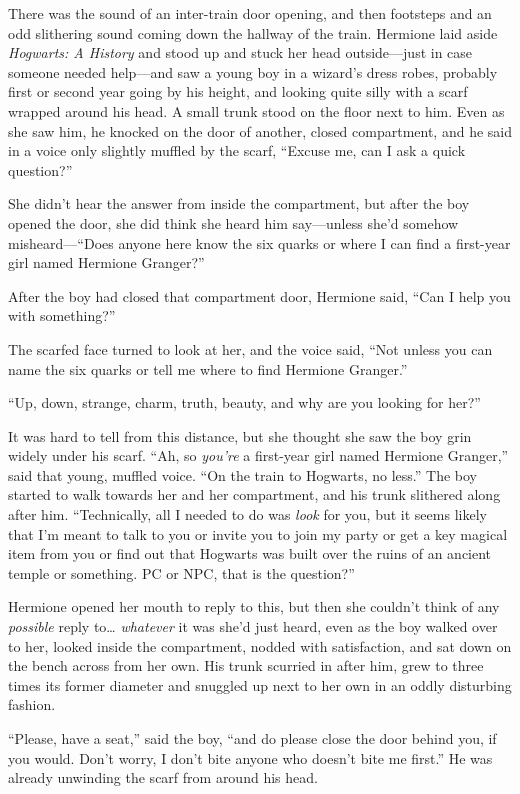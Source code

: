 There was the sound of an inter-train door opening, and then footsteps
and an odd slithering sound coming down the hallway of the train.
Hermione laid aside \emph{Hogwarts: A History} and stood up and stuck
her head outside---just in case someone needed help---and saw a young
boy in a wizard's dress robes, probably first or second year going by
his height, and looking quite silly with a scarf wrapped around his
head. A small trunk stood on the floor next to him. Even as she saw him,
he knocked on the door of another, closed compartment, and he said in a
voice only slightly muffled by the scarf, ``Excuse me, can I ask a quick
question?''

She didn't hear the answer from inside the compartment, but after the
boy opened the door, she did think she heard him say---unless she'd
somehow misheard---``Does anyone here know the six quarks or where I can
find a first-year girl named Hermione Granger?''

After the boy had closed that compartment door, Hermione said, ``Can I
help you with something?''

The scarfed face turned to look at her, and the voice said, ``Not unless
you can name the six quarks or tell me where to find Hermione Granger.''

``Up, down, strange, charm, truth, beauty, and why are you looking for
her?''

It was hard to tell from this distance, but she thought she saw the boy
grin widely under his scarf. ``Ah, so \emph{you're} a first-year girl
named Hermione Granger,'' said that young, muffled voice. ``On the train
to Hogwarts, no less.'' The boy started to walk towards her and her
compartment, and his trunk slithered along after him. ``Technically, all
I needed to do was \emph{look} for you, but it seems likely that I'm
meant to talk to you or invite you to join my party or get a key magical
item from you or find out that Hogwarts was built over the ruins of an
ancient temple or something. PC or NPC, that is the question?''

Hermione opened her mouth to reply to this, but then she couldn't think
of any \emph{possible} reply to\ldots{} \emph{whatever} it was she'd
just heard, even as the boy walked over to her, looked inside the
compartment, nodded with satisfaction, and sat down on the bench across
from her own. His trunk scurried in after him, grew to three times its
former diameter and snuggled up next to her own in an oddly disturbing
fashion.

``Please, have a seat,'' said the boy, ``and do please close the door
behind you, if you would. Don't worry, I don't bite anyone who doesn't
bite me first.'' He was already unwinding the scarf from around his
head.

